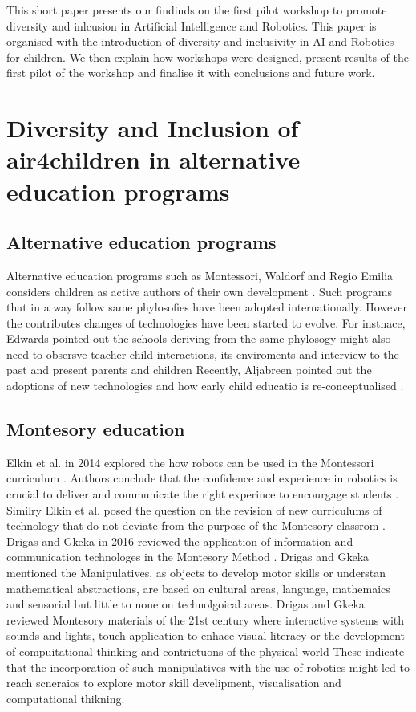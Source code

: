 \documentclass[conference]{IEEEtran}
\begin{document}
This short paper presents our findinds on the first pilot workshop to promote diversity and inlcusion in Artificial Intelligence and Robotics.
This paper is organised with the introduction of diversity and inclusivity in AI and Robotics for children. 
We then explain how workshops were designed, present results of the first pilot of the workshop and finalise it with conclusions and future work.

\section{Diversity and Inclusion of air4children in alternative education programs}

\subsection{Alternative education programs}
Alternative education programs such as Montessori, Waldorf and Regio Emilia considers children as active authors of their own development \cite{edwards2002}.
Such programs that in a way follow same phylosofies have been adopted internationally.
However the contributes changes of technologies have been started to evolve. 
For instnace, Edwards pointed out the schools deriving from the same phylosogy might also need to obsersve teacher-child interactions, its enviroments and interview to the past and present parents and children \cite{edwards2002}
Recently, Aljabreen pointed out the adoptions of new technologies and how early child educatio is re-conceptualised \cite{Aljabreen2020}.

\subsection{Montesory education}
Elkin et al. in 2014 explored the how robots can be used in the Montessori curriculum \cite{elkin2014}.
Authors conclude that the confidence and experience in robotics is crucial to deliver and communicate the right experince to encourgage students \cite{elkin2014}.
Similry Elkin et al. posed the question on the revision of new curriculums of technology that do not deviate from the purpose of the Montesory classrom \cite{elkin2014}.
Drigas and Gkeka in 2016 reviewed the application of information and communication technologes in the Montesory Method \cite{DrigasGkeka2016}.
Drigas and Gkeka mentioned the Manipulatives, as objects to develop motor skills or understan mathematical abstractions, are based on cultural areas, language, mathemaics and sensorial but little to none on technolgoical areas.
Drigas and Gkeka reviewed Montesory materials of the 21st century where interactive systems with sounds and lights, touch application to enhace visual literacy or the development of compuitational thinking and contrictuons of the physical world \cite{DrigasGkeka2016}
These indicate that the incorporation of such manipulatives with the use of robotics might led to reach scneraios to explore motor skill develipment, visualisation and computational thikning. 
\end{document}
